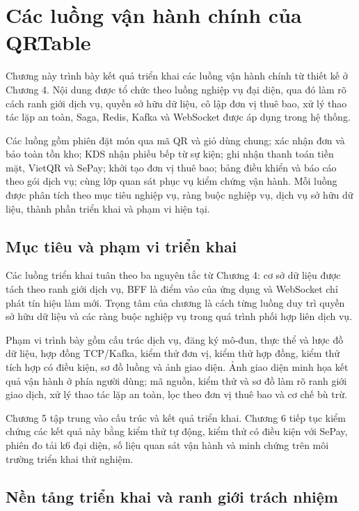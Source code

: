 \chapter{Các luồng vận hành chính của QRTable}

Chương này trình bày kết quả triển khai các luồng vận hành chính từ thiết kế ở Chương 4. Nội dung được tổ chức theo luồng nghiệp vụ đại diện, qua đó làm rõ cách ranh giới dịch vụ, quyền sở hữu dữ liệu, cô lập đơn vị thuê bao, xử lý thao tác lặp an toàn, Saga, Redis, Kafka và WebSocket được áp dụng trong hệ thống.

Các luồng gồm phiên đặt món qua mã QR và giỏ dùng chung; xác nhận đơn và bảo toàn tồn kho; KDS nhận phiếu bếp từ sự kiện; ghi nhận thanh toán tiền mặt, VietQR và SePay; khởi tạo đơn vị thuê bao; bảng điều khiển và báo cáo theo gói dịch vụ; cùng lớp quan sát phục vụ kiểm chứng vận hành. Mỗi luồng được phân tích theo mục tiêu nghiệp vụ, ràng buộc nghiệp vụ, dịch vụ sở hữu dữ liệu, thành phần triển khai và phạm vi hiện tại.

\section{Mục tiêu và phạm vi triển khai}

Các luồng triển khai tuân theo ba nguyên tắc từ Chương 4: cơ sở dữ liệu được tách theo ranh giới dịch vụ, BFF là điểm vào của ứng dụng và WebSocket chỉ phát tín hiệu làm mới. Trọng tâm của chương là cách từng luồng duy trì quyền sở hữu dữ liệu và các ràng buộc nghiệp vụ trong quá trình phối hợp liên dịch vụ.

Phạm vi trình bày gồm cấu trúc dịch vụ, đăng ký mô-đun, thực thể và lược đồ dữ liệu, hợp đồng TCP/Kafka, kiểm thử đơn vị, kiểm thử hợp đồng, kiểm thử tích hợp có điều kiện, sơ đồ luồng và ảnh giao diện. Ảnh giao diện minh họa kết quả vận hành ở phía người dùng; mã nguồn, kiểm thử và sơ đồ làm rõ ranh giới giao dịch, xử lý thao tác lặp an toàn, lọc theo đơn vị thuê bao và cơ chế bù trừ.

Chương 5 tập trung vào cấu trúc và kết quả triển khai. Chương 6 tiếp tục kiểm chứng các kết quả này bằng kiểm thử tự động, kiểm thử có điều kiện với SePay, phiên đo tải k6 đại diện, số liệu quan sát vận hành và minh chứng trên môi trường triển khai thử nghiệm.

\section{Nền tảng triển khai và ranh giới trách nhiệm}

